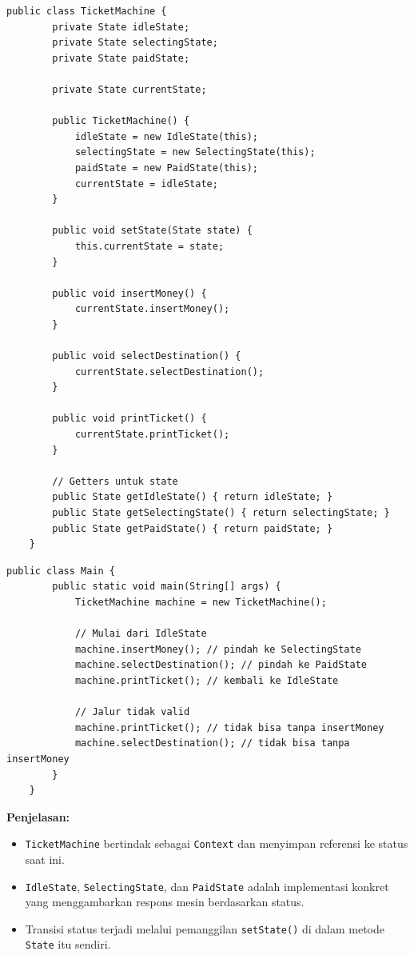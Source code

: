 \begin{lstlisting}[style=JavaStyle, caption={Context: TicketMachine}]
	public class TicketMachine {
		private State idleState;
		private State selectingState;
		private State paidState;
		
		private State currentState;
		
		public TicketMachine() {
			idleState = new IdleState(this);
			selectingState = new SelectingState(this);
			paidState = new PaidState(this);
			currentState = idleState;
		}
		
		public void setState(State state) {
			this.currentState = state;
		}
		
		public void insertMoney() {
			currentState.insertMoney();
		}
		
		public void selectDestination() {
			currentState.selectDestination();
		}
		
		public void printTicket() {
			currentState.printTicket();
		}
		
		// Getters untuk state
		public State getIdleState() { return idleState; }
		public State getSelectingState() { return selectingState; }
		public State getPaidState() { return paidState; }
	}
\end{lstlisting}

\begin{lstlisting}[style=JavaStyle, caption={Client: Demonstrasi Perpindahan State}]
	public class Main {
		public static void main(String[] args) {
			TicketMachine machine = new TicketMachine();
			
			// Mulai dari IdleState
			machine.insertMoney(); // pindah ke SelectingState
			machine.selectDestination(); // pindah ke PaidState
			machine.printTicket(); // kembali ke IdleState
			
			// Jalur tidak valid
			machine.printTicket(); // tidak bisa tanpa insertMoney
			machine.selectDestination(); // tidak bisa tanpa insertMoney
		}
	}
\end{lstlisting}

\textbf{Penjelasan:}
\begin{itemize}
	\item \texttt{TicketMachine} bertindak sebagai \texttt{Context} dan menyimpan referensi ke status saat ini.
	\item \texttt{IdleState}, \texttt{SelectingState}, dan \texttt{PaidState} adalah implementasi konkret yang menggambarkan respons mesin berdasarkan status.
	\item Transisi status terjadi melalui pemanggilan \texttt{setState()} di dalam metode \texttt{State} itu sendiri.
\end{itemize}

